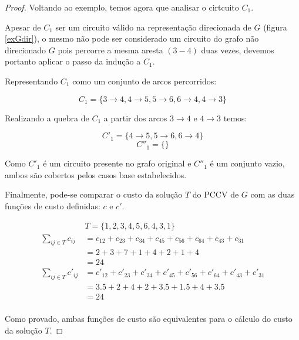 \begin{proof}
            Voltando ao exemplo, temos agora que analisar o cirtcuito $C_1$.

            Apesar de $C_1$ ser um circuito válido na representação direcionada de $G$ (figura \ref{exGdir}), o mesmo não pode ser considerado um circuito do grafo não direcionado $G$ pois percorre a mesma aresta $(3 - 4)$ duas vezes, devemos portanto aplicar o passo da indução a $C_1$.
            
            Representando $C_1$ como um conjunto de arcos percorridos:

            \[
                C_1 = \{ 3\rightarrow 4, 4\rightarrow 5, 5\rightarrow 6, 6\rightarrow 4, 4\rightarrow 3 \}                
            \]

            Realizando a quebra de $C_1$ a partir dos arcos $3 \rightarrow 4$ e $4 \rightarrow 3$ temos:

            \[
                C'_1  = \{4 \rightarrow 5, 5\rightarrow 6, 6\rightarrow 4\}
            \]
            \[
                C''_1 = \{\}
            \] 

            Como $C'_1$ é um circuito presente no grafo original e $C''_1$ é um conjunto vazio, ambos são cobertos pelos casos base estabelecidos.

            Finalmente, pode-se comparar o custo da solução $T$ do PCCV de $G$ com as duas funções de custo definidas: $c$ e $c'$.

            \begin{align*}
                & T = \{ 1, 2, 3, 4, 5, 6, 4, 3, 1\} \\
                \sum_{ij \in T} c_{ij} &= c_{12} + c_{23} + c_{34} + c_{45} + c_{56} + c_{64} + c_{43} + c_{31} \\
                &= 2 + 3 + 7 + 1 + 4 + 2 + 1 + 4 \\
                &= 24 \\
                \sum_{ij \in T} c'_{ij} &= c'_{12} + c'_{23} + c'_{34} + c'_{45} + c'_{56} + c'_{64} + c'_{43} + c'_{31} \\
                &= 3.5 + 2 + 4 + 2 + 3.5 + 1.5 + 4 + 3.5 \\
                &= 24 \\
            \end{align*}

            Como provado, ambas funções de custo são equivalentes para o cálculo do custo da solução $T$.
        \end{proof}

%
%
